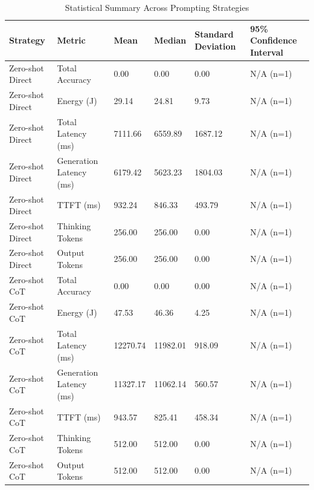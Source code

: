 \begin{table}
\caption{Statistical Summary Across Prompting Strategies}
\label{tab:statistical_summary}
\begin{tabular}{llllll}
\toprule
Strategy & Metric & Mean & Median & Standard Deviation & 95\% Confidence Interval \\
\midrule
Zero-shot Direct & Total Accuracy & 0.00 & 0.00 & 0.00 & N/A (n=1) \\
Zero-shot Direct & Energy (J) & 29.14 & 24.81 & 9.73 & N/A (n=1) \\
Zero-shot Direct & Total Latency (ms) & 7111.66 & 6559.89 & 1687.12 & N/A (n=1) \\
Zero-shot Direct & Generation Latency (ms) & 6179.42 & 5623.23 & 1804.03 & N/A (n=1) \\
Zero-shot Direct & TTFT (ms) & 932.24 & 846.33 & 493.79 & N/A (n=1) \\
Zero-shot Direct & Thinking Tokens & 256.00 & 256.00 & 0.00 & N/A (n=1) \\
Zero-shot Direct & Output Tokens & 256.00 & 256.00 & 0.00 & N/A (n=1) \\
Zero-shot CoT & Total Accuracy & 0.00 & 0.00 & 0.00 & N/A (n=1) \\
Zero-shot CoT & Energy (J) & 47.53 & 46.36 & 4.25 & N/A (n=1) \\
Zero-shot CoT & Total Latency (ms) & 12270.74 & 11982.01 & 918.09 & N/A (n=1) \\
Zero-shot CoT & Generation Latency (ms) & 11327.17 & 11062.14 & 560.57 & N/A (n=1) \\
Zero-shot CoT & TTFT (ms) & 943.57 & 825.41 & 458.34 & N/A (n=1) \\
Zero-shot CoT & Thinking Tokens & 512.00 & 512.00 & 0.00 & N/A (n=1) \\
Zero-shot CoT & Output Tokens & 512.00 & 512.00 & 0.00 & N/A (n=1) \\
\bottomrule
\end{tabular}
\end{table}
